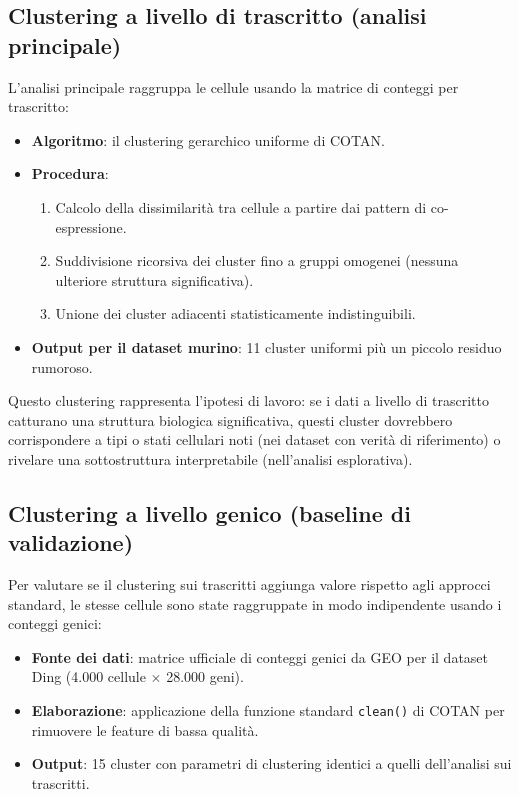 \subsection*{Clustering a livello di trascritto (analisi principale)}

L'analisi principale raggruppa le cellule usando la matrice di conteggi per trascritto:

\begin{itemize}
    \item \textbf{Algoritmo}: il clustering gerarchico uniforme di COTAN.
    \item \textbf{Procedura}:
    \begin{enumerate}
        \item Calcolo della dissimilarità tra cellule a partire dai pattern di co-espressione.
        \item Suddivisione ricorsiva dei cluster fino a gruppi omogenei (nessuna ulteriore struttura significativa).
        \item Unione dei cluster adiacenti statisticamente indistinguibili.
    \end{enumerate}
    \item \textbf{Output per il dataset murino}: 11 cluster uniformi più un piccolo residuo rumoroso.
\end{itemize}

Questo clustering rappresenta l'ipotesi di lavoro: se i dati a livello di trascritto catturano una struttura biologica significativa, questi cluster dovrebbero corrispondere a tipi o stati cellulari noti (nei dataset con verità di riferimento) o rivelare una sottostruttura interpretabile (nell'analisi esplorativa).

\subsection*{Clustering a livello genico (baseline di validazione)}

Per valutare se il clustering sui trascritti aggiunga valore rispetto agli approcci standard, le stesse cellule sono state raggruppate in modo indipendente usando i conteggi genici:

\begin{itemize}
    \item \textbf{Fonte dei dati}: matrice ufficiale di conteggi genici da GEO per il dataset Ding (4.000 cellule $\times$ 28.000 geni).
    \item \textbf{Elaborazione}: applicazione della funzione standard \texttt{clean()} di COTAN per rimuovere le feature di bassa qualità.
    \item \textbf{Output}: 15 cluster con parametri di clustering identici a quelli dell'analisi sui trascritti.
\end{itemize}


